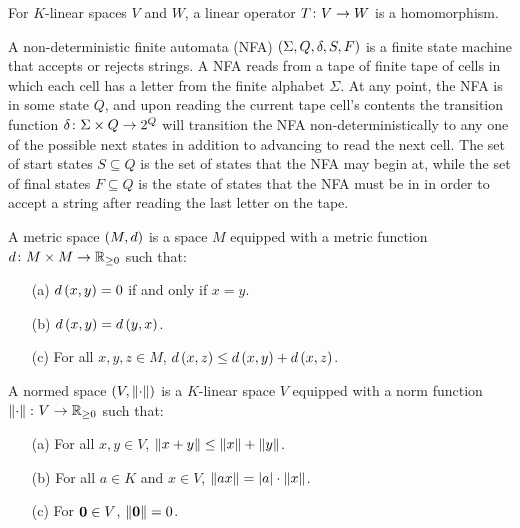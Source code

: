 \documentclass[12pt]{article}
\begin{document}
\begin{definition}
  For \(K\)-linear spaces \(V\) and \(W\), a linear operator
  \(T \colon V \to W\) is a homomorphism.
\end{definition}


\begin{definition}
  A non-deterministic finite automata (NFA)
  \(\left(\Sigma, Q, \delta, S, F\right)\)
  is a finite state machine that accepts or rejects strings.
  A NFA reads from a tape of finite tape of cells in which each cell
  has a letter from the finite alphabet \(\Sigma\).
  At any point, the NFA is in some state \(Q\), and
  upon reading the current tape cell's contents
  the transition function \(\delta \colon \Sigma \times Q \to 2^{Q}\)
  will transition the NFA non-deterministically to any one of
  the possible next states in addition to advancing to read the next cell.
  The set of start states \(S \subseteq Q\) is the set of states
  that the NFA may begin at,
  while the set of final states \(F \subseteq Q\) is the state of states
  that the NFA must be in in order to accept a string
  after reading the last letter on the tape.
\end{definition}


\begin{definition}
  A metric space \(\left(M, d\right)\) is a space \(M\) equipped with a
  metric function \(d \colon M \times M \to \mathbb{R}_{\geq 0}\) such that:
  \begin{enumerate}
    \item[(a)]
      \(d\left(x, y\right) = 0\) if and only if \(x = y\).

    \item[(b)]
      \(d\left(x, y\right) = d\left(y, x\right)\).

    \item[(c)]
      For all \(x, y, z \in M\),
      \(d\left(x, z\right) \leq d\left(x, y\right) + d\left(x, z\right)\).
  \end{enumerate}
\end{definition}


\begin{definition}
  A normed space \(\left(V, \left\lVert\cdot\right\rVert\right)\) is a \(K\)-linear space \(V\)
  equipped with a norm function \(\left\lVert\cdot\right\rVert \colon V \to \mathbb{R}_{\geq 0}\) such that:
  \begin{enumerate}
    \item[(a)]
      For all \(x, y \in V\), \(\left\lVert x + y\right\rVert \leq \left\lVert x\right\rVert + \left\lVert y\right\rVert\).

    \item[(b)]
      For all \(a \in K\) and \(x \in V\),
      \(\left\lVert ax\right\rVert = \left\lvert a\right\rvert \cdot \left\lVert x\right\rVert\).

    \item[(c)]
      For \(\mathbf{0} \in V\), \(\left\lVert\mathbf{0}\right\rVert = 0\).
  \end{enumerate}
\end{definition}
\end{document}
